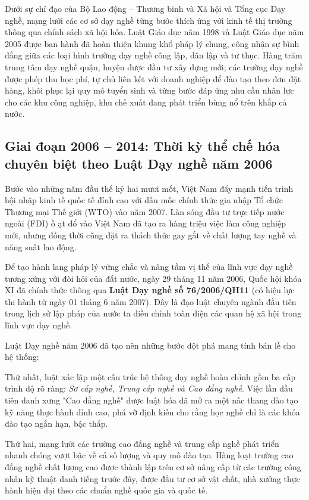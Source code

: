 Dưới sự chỉ đạo của Bộ Lao động -- Thương binh và Xã hội và Tổng cục Dạy nghề, mạng lưới các cơ sở dạy nghề từng bước thích ứng với kinh tế thị trường thông qua chính sách xã hội hóa. Luật Giáo dục năm 1998 và Luật Giáo dục năm 2005 được ban hành đã hoàn thiện khung khổ pháp lý chung, công nhận sự bình đẳng giữa các loại hình trường dạy nghề công lập, dân lập và tư thục. Hàng trăm trung tâm dạy nghề quận, huyện được đầu tư xây dựng mới; các trường dạy nghề được phép thu học phí, tự chủ liên kết với doanh nghiệp để đào tạo theo đơn đặt hàng, khôi phục lại quy mô tuyển sinh và từng bước đáp ứng nhu cầu nhân lực cho các khu công nghiệp, khu chế xuất đang phát triển bùng nổ trên khắp cả nước.

\subsection{Giai đoạn 2006 -- 2014: Thời kỳ thể chế hóa chuyên biệt theo Luật Dạy nghề năm 2006}

Bước vào những năm đầu thế kỷ hai mươi mốt, Việt Nam đẩy mạnh tiến trình hội nhập kinh tế quốc tế đỉnh cao với dấu mốc chính thức gia nhập Tổ chức Thương mại Thế giới (WTO) vào năm 2007. Làn sóng đầu tư trực tiếp nước ngoài (FDI) ồ ạt đổ vào Việt Nam đã tạo ra hàng triệu việc làm công nghiệp mới, nhưng đồng thời cũng đặt ra thách thức gay gắt về chất lượng tay nghề và năng suất lao động. 

Để tạo hành lang pháp lý vững chắc và nâng tầm vị thế của lĩnh vực dạy nghề tương xứng với đòi hỏi của đất nước, ngày 29 tháng 11 năm 2006, Quốc hội khóa XI đã chính thức thông qua \textbf{Luật Dạy nghề số 76/2006/QH11} (có hiệu lực thi hành từ ngày 01 tháng 6 năm 2007). Đây là đạo luật chuyên ngành đầu tiên trong lịch sử lập pháp của nước ta điều chỉnh toàn diện các quan hệ xã hội trong lĩnh vực dạy nghề.

Luật Dạy nghề năm 2006 đã tạo nên những bước đột phá mang tính bản lề cho hệ thống:

Thứ nhất, luật xác lập một cấu trúc hệ thống dạy nghề hoàn chỉnh gồm ba cấp trình độ rõ ràng: \textit{Sơ cấp nghề, Trung cấp nghề và Cao đẳng nghề}. Việc lần đầu tiên danh xưng "Cao đẳng nghề" được luật hóa đã mở ra một nấc thang đào tạo kỹ năng thực hành đỉnh cao, phá vỡ định kiến cho rằng học nghề chỉ là các khóa đào tạo ngắn hạn, bậc thấp.

Thứ hai, mạng lưới các trường cao đẳng nghề và trung cấp nghề phát triển nhanh chóng vượt bậc về cả số lượng và quy mô đào tạo. Hàng loạt trường cao đẳng nghề chất lượng cao được thành lập trên cơ sở nâng cấp từ các trường công nhân kỹ thuật danh tiếng trước đây, được đầu tư cơ sở vật chất, nhà xưởng thực hành hiện đại theo các chuẩn nghề quốc gia và quốc tế.

